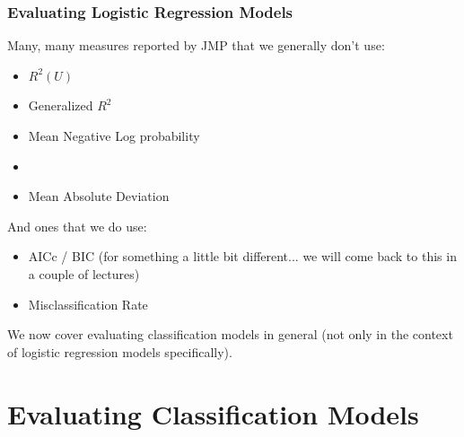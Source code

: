 \documentclass[handout]{beamer}
\begin{document}
\begin{frame}\frametitle{Evaluating Logistic Regression Models}

Many, many measures reported by JMP that we generally don't use: \pause

\begin{itemize}
\item $R^2(U)$
\item Generalized $R^2$
\item Mean Negative Log probability
\item {}
\item Mean Absolute Deviation \pause
\end{itemize}

And ones that we do use:

\begin{itemize}
\item AICc / BIC (for something a little bit different... we will come back to this in a couple of lectures) \pause
\item Misclassification Rate \pause
\end{itemize}

We now cover evaluating classification models in general (not only in the context of logistic regression models specifically).

\end{frame}

\section{Evaluating Classification Models}
\end{document}
